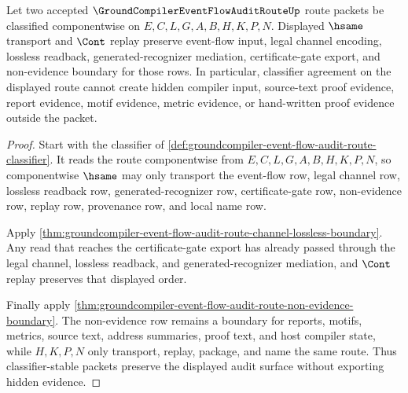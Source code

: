 \begin{theorem}
\label{thm:groundcompiler-event-flow-audit-route-classifier-stability}
Let two accepted $\GroundCompilerEventFlowAuditRouteUp$ route packets be classified componentwise on $E,C,L,G,A,B,H,K,P,N$. Displayed $\hsame$ transport and $\Cont$ replay preserve event-flow input, legal channel encoding, lossless readback, generated-recognizer mediation, certificate-gate export, and non-evidence boundary for those rows. In particular, classifier agreement on the displayed route cannot create hidden compiler input, source-text proof evidence, report evidence, motif evidence, metric evidence, or hand-written proof evidence outside the packet.
\end{theorem}
\begin{proof}
Start with the classifier of \autoref{def:groundcompiler-event-flow-audit-route-classifier}. It reads the route componentwise from $E,C,L,G,A,B,H,K,P,N$, so componentwise $\hsame$ may only transport the event-flow row, legal channel row, lossless readback row, generated-recognizer row, certificate-gate row, non-evidence row, replay row, provenance row, and local name row.

Apply \autoref{thm:groundcompiler-event-flow-audit-route-channel-lossless-boundary}. Any read that reaches the certificate-gate export has already passed through the legal channel, lossless readback, and generated-recognizer mediation, and $\Cont$ replay preserves that displayed order.

Finally apply \autoref{thm:groundcompiler-event-flow-audit-route-non-evidence-boundary}. The non-evidence row remains a boundary for reports, motifs, metrics, source text, address summaries, proof text, and host compiler state, while $H,K,P,N$ only transport, replay, package, and name the same route. Thus classifier-stable packets preserve the displayed audit surface without exporting hidden evidence.
\end{proof}

